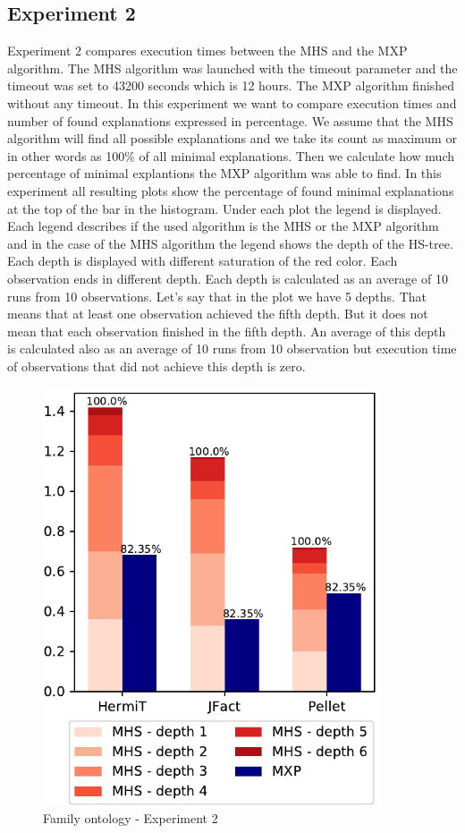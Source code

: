 \documentclass[12pt,a4paper]{article}
\begin{document}
\subsection{Experiment 2}
Experiment 2 compares execution times between the MHS and the MXP algorithm. The MHS algorithm was launched with the timeout parameter and the timeout was set to 43200 seconds which is 12 hours. The MXP algorithm finished without any timeout. In this experiment we want to compare execution times and number of found explanations expressed in percentage. We assume that the MHS algorithm will find all possible explanations and we take its count as maximum or in other words as 100\% of all minimal explanations. Then we calculate how much percentage of minimal explantions the MXP algorithm was able to find. In this experiment all resulting plots show the percentage of found minimal explanations at the top of the bar in the histogram. Under each plot the legend is displayed. Each legend describes if the used algorithm is the MHS or the MXP algorithm and in the case of the MHS algorithm the legend shows the depth of the HS-tree. Each depth is displayed with different saturation of the red color. Each observation ends in different depth. Each depth is calculated as an average of 10 runs from 10 observations. Let's say that in the plot we have 5 depths. That means that at least one observation achieved the fifth depth. But it does not mean that each observation finished in the fifth depth. An average of this depth is calculated also as an average of 10 runs from 10 observation but execution time of observations that did not achieve this depth is zero.

\begin{figure}[H]
	\centering
	\includegraphics[width=10cm]{eval2Family} 	
	\caption{Family ontology - Experiment 2}
	\label{fig:eval2Family}
\end{figure}
\end{document}
